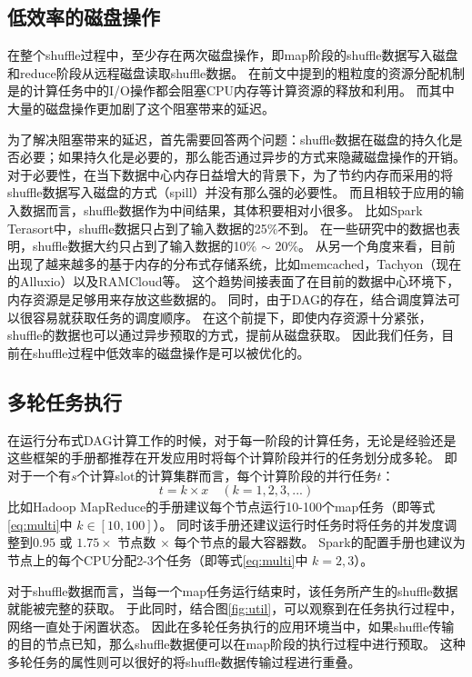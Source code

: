 \subsection{低效率的磁盘操作}
\label{subsec:size}

在整个shuffle过程中，至少存在两次磁盘操作，即map阶段的shuffle数据写入磁盘和reduce阶段从远程磁盘读取shuffle数据。
在前文中提到的粗粒度的资源分配机制是的计算任务中的I/O操作都会阻塞CPU内存等计算资源的释放和利用。
而其中大量的磁盘操作更加剧了这个阻塞带来的延迟。

为了解决阻塞带来的延迟，首先需要回答两个问题：shuffle数据在磁盘的持久化是否必要；如果持久化是必要的，那么能否通过异步的方式来隐藏磁盘操作的开销。
对于必要性，在当下数据中心内存日益增大的背景下，为了节约内存而采用的将shuffle数据写入磁盘的方式（spill）并没有那么强的必要性。
而且相较于应用的输入数据而言，shuffle数据作为中间结果，其体积要相对小很多。
比如Spark Terasort\cite{spark-tera}中，shuffle数据只占到了输入数据的25\%不到。
在一些研究中\cite{makingsense}的数据也表明，shuffle数据大约只占到了输入数据的10\% $\sim$ 20\%。
从另一个角度来看，目前出现了越来越多的基于内存的分布式存储系统，比如memcached\cite{memcached}，Tachyon\cite{tachyon}（现在的Alluxio\cite{alluxio}）以及RAMCloud\cite{ramcloud}等。
这个趋势间接表面了在目前的数据中心环境下，内存资源是足够用来存放这些数据的。
同时，由于DAG的存在，结合调度算法可以很容易就获取任务的调度顺序。
在这个前提下，即使内存资源十分紧张，shuffle的数据也可以通过异步预取的方式，提前从磁盘获取。
因此我们任务，目前在shuffle过程中低效率的磁盘操作是可以被优化的。

\subsection{多轮任务执行}

在运行分布式DAG计算工作的时候，对于每一阶段的计算任务，无论是经验还是这些框架的手册都推荐在开发应用时将每个计算阶段并行的任务划分成多轮。
即对于一个有$s$个计算slot的计算集群而言，每个计算阶段的并行任务$t$：
\begin{equation}
	\label{eq:multi}
	t = k \times x \quad (k = 1, 2, 3, ...)
\end{equation}
比如Hadoop MapReduce的手册\cite{hadooptutorial}建议每个节点运行10-100个map任务（即等式\ref{eq:multi}中 $k \in [10, 100]$）。
同时该手册还建议运行时任务时将任务的并发度调整到$0.95$ 或 $1.75 \times$ 节点数 $\times$ 每个节点的最大容器数。
Spark的配置手册\cite{sparkconf}也建议为节点上的每个CPU分配2-3个任务（即等式\ref{eq:multi}中 $k = 2, 3$）。

对于shuffle数据而言，当每一个map任务运行结束时，该任务所产生的shuffle数据就能被完整的获取。
于此同时，结合图\ref{fig:util}，可以观察到在任务执行过程中，网络一直处于闲置状态。
因此在多轮任务执行的应用环境当中，如果shuffle传输的目的节点已知，那么shuffle数据便可以在map阶段的执行过程中进行预取。
这种多轮任务的属性则可以很好的将shuffle数据传输过程进行重叠。

